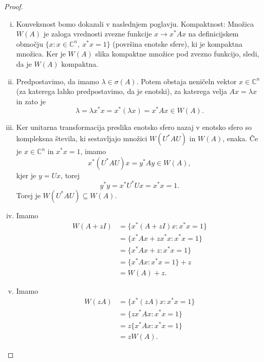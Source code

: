\documentclass[12pt,a4paper]{amsart}
\theoremstyle{definition}
\theoremstyle{plain}
\newcommand{\C}{\mathbb C}
\begin{document}
\begin{proof}
\begin{enumerate}[(i)]
\item Konveksnost bomo dokazali v naslednjem poglavju. Kompaktnost: Množica $W(A)$ je zaloga vrednosti zvezne funkcije $x \rightarrow x^\ast Ax$ na definicijskem območju $\{x\! :x\in \C^n ,\ x^\ast x=1\}$ (površina enotske sfere), ki je kompaktna množica. Ker je $W(A)$ slika kompaktne množice pod zvezno funkcijo, sledi, da je $W(A)$ kompaktna.
\item Predpostavimo, da imamo $\lambda \in \sigma(A)$. Potem obstaja neničeln vektor $x\in \C ^n$ (za katerega lahko predpostavimo, da je enotski), za katerega velja $Ax=\lambda x$ in zato je
$$\lambda = \lambda x^\ast x=x^\ast (\lambda x) = x^\ast Ax \in W(A).$$
\item Ker unitarna transformacija preslika enotsko sfero nazaj v enotsko sfero so kompleksna števila, ki sestavljajo množici $W(U^\ast AU)$ in $W(A)$, enaka. 
Če je $x\in \C^n$ in $x^\ast x=1$, imamo $$x^\ast (U^\ast AU)x=y^\ast Ay \in W(A),$$ kjer je $y = Ux$, torej $$y^\ast y=x^\ast U^\ast Ux=x^\ast x=1.$$ Torej je $W(U^\ast AU)\subseteq W(A)$. 

\item Imamo 
\begin{align*}
W(A +zI)&=\{x^\ast (A+zI)x\! : x^\ast x=1\}\\
& = \{x^\ast Ax + zx^\ast x\! : x^\ast x =1\}\\
 &= \{x^\ast Ax + z\! : x^\ast x=1\} \\
&= \{x^\ast Ax\! : x^\ast x=1\} +z \\
&= W(A) +z.
\end{align*}
\item Imamo 
\begin{align*}
W(zA) &= \{x^\ast (zA)x\! : x^\ast x=1\}\\
& = \{zx^\ast Ax\! :x^\ast x =1\}\\
&= z\{x^\ast Ax\! :x^\ast x=1\}\\
& = zW(A).
\end{align*}


\end{enumerate}
\end{proof}
\end{document}
